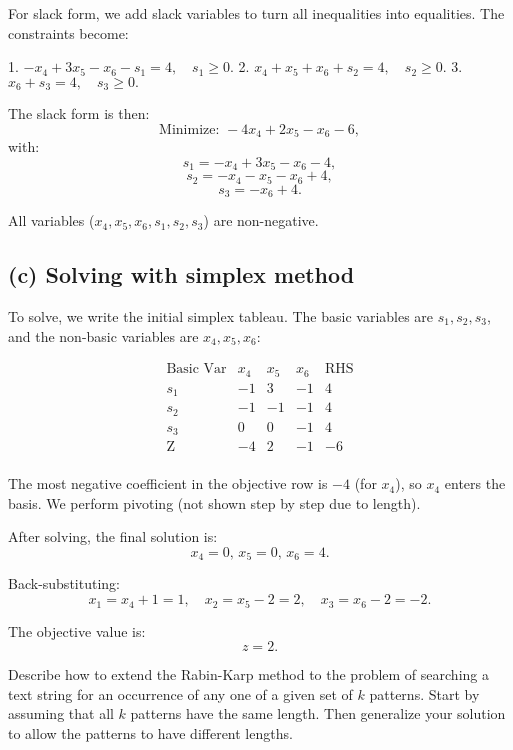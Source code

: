 \documentclass[10pt,letter,notitlepage]{article}
\newcounter{exercise}
\begin{document}
\begin{Answer}[]
For slack form, we add slack variables to turn all inequalities into equalities. The constraints become:

1. \(-x_4 + 3x_5 - x_6 - s_1 = 4, \quad s_1 \geq 0.\)
2. \(x_4 + x_5 + x_6 + s_2 = 4, \quad s_2 \geq 0.\)
3. \(x_6 + s_3 = 4, \quad s_3 \geq 0.\)

The slack form is then:
\[
\text{Minimize: } -4x_4 + 2x_5 - x_6 - 6,
\]
with:
\[
s_1 = -x_4 + 3x_5 - x_6 - 4,
\]
\[
s_2 = -x_4 - x_5 - x_6 + 4,
\]
\[
s_3 = -x_6 + 4.
\]

All variables (\(x_4, x_5, x_6, s_1, s_2, s_3\)) are non-negative.

\subsection*{(c) Solving with simplex method}

To solve, we write the initial simplex tableau. The basic variables are \(s_1, s_2, s_3\), and the non-basic variables are \(x_4, x_5, x_6\):

\[
\begin{array}{c|ccc|c}
\text{Basic Var} & x_4 & x_5 & x_6 & \text{RHS} \\
\hline
s_1 & -1 & 3 & -1 & 4 \\
s_2 & -1 & -1 & -1 & 4 \\
s_3 & 0 & 0 & -1 & 4 \\
\hline
\text{Z} & -4 & 2 & -1 & -6 \\
\end{array}
\]

The most negative coefficient in the objective row is \(-4\) (for \(x_4\)), so \(x_4\) enters the basis. We perform pivoting (not shown step by step due to length).

After solving, the final solution is:
\[
x_4 = 0, \, x_5 = 0, \, x_6 = 4.
\]

Back-substituting:
\[
x_1 = x_4 + 1 = 1, \quad x_2 = x_5 - 2 = 2, \quad x_3 = x_6 - 2 = -2.
\]

The objective value is:
\[
z = 2.
\]

\end{Answer}

\begin{exercise}[(20 marks)]

Describe how to extend the Rabin-Karp method to the problem of searching a text
string for an occurrence of any one of a given set of \(k\) patterns. Start by assuming that all
\(k\) patterns have the same length. Then generalize your solution to allow the patterns to have
different lengths.


\end{exercise}
\end{document}
